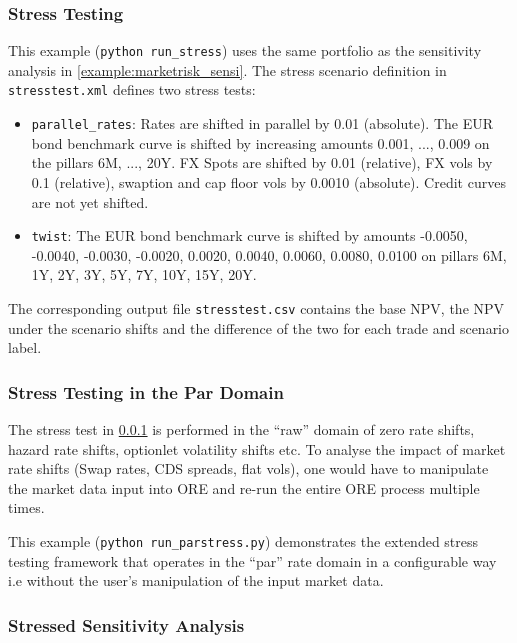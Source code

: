 \subsubsection{Stress Testing}
\label{example:marketrisk_stress}

This example ({\tt python run\_stress}) uses the same portfolio as the sensitivity analysis in
\ref{example:marketrisk_sensi}.  The stress scenario definition in {\tt stresstest.xml} defines two
stress tests:

\begin{itemize}
\item {\tt parallel\_rates}: Rates are shifted in parallel by 0.01 (absolute). The EUR bond benchmark curve is shifted by
  increasing amounts 0.001, ..., 0.009 on the pillars 6M, ..., 20Y. FX Spots are shifted by 0.01 (relative), FX vols by
  0.1 (relative), swaption and cap floor vols by 0.0010 (absolute).
  Credit curves are not yet shifted.
\item {\tt twist}: The EUR bond benchmark curve is shifted by amounts -0.0050, -0.0040, -0.0030, -0.0020, 0.0020,
  0.0040, 0.0060, 0.0080, 0.0100 on pillars 6M, 1Y, 2Y, 3Y, 5Y, 7Y, 10Y, 15Y, 20Y.
\end{itemize}

The corresponding output file {\tt stresstest.csv} contains the base NPV, the NPV under the scenario shifts and the
difference of the two for each trade and scenario label.

\subsubsection{Stress Testing in the Par Domain}
\label{example:marketrisk_parstress}

The stress test in \ref{example:marketrisk_stress} is performed in the ``raw'' domain
of zero rate shifts, hazard rate shifts, optionlet volatility shifts etc.
To analyse the impact of market rate shifts (Swap rates, CDS spreads, flat vols), one would have to
manipulate the market data input into ORE and re-run the entire ORE process multiple times.

This example ({\tt python run\_parstress.py}) demonstrates the extended
stress testing framework that operates in the ``par'' rate domain in a configurable way i.e without
the user's manipulation of the input market data.

\subsubsection{Stressed Sensitivity Analysis}
\label{example:marketrisk_sensistress}

